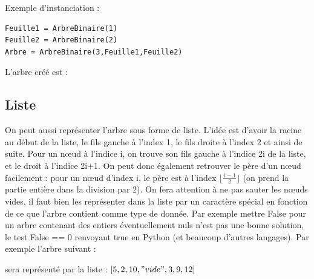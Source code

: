 \documentclass{report}
\begin{document}
Exemple d'instanciation :

\begin{lstlisting}
Feuille1 = ArbreBinaire(1)
Feuille2 = ArbreBinaire(2)
Arbre = ArbreBinaire(3,Feuille1,Feuille2)
\end{lstlisting}

L'arbre créé est :
\begin{center}
\end{center}

\subsection{Liste}

On peut aussi représenter l'arbre sous forme de liste. L'idée est d'avoir la racine au début de la liste, le fils gauche à l'index 1, le fils droite à l'index 2 et ainsi de suite. Pour un nœud à l'indice i, on trouve son fils gauche à l'indice 2i de la liste, et le droit à l'indice 2i+1. 
On peut donc également retrouver le père d'un nœud facilement : pour un nœud d'index i, le père est à l'index $\lfloor \frac{i-1}{2} \rfloor$ (on prend la partie entière dans la division par 2).
On fera attention à ne pas sauter les nœuds vides, il faut bien les représenter dans la liste par un caractère spécial en fonction de ce que l'arbre contient comme type de donnée. Par exemple mettre False pour un arbre contenant des entiers éventuellement nuls n'est pas une bonne solution, le test False == 0 renvoyant true en Python (et beaucoup d'autres langages).
Par exemple l'arbre suivant :

\begin{center}
\end{center}

sera représenté par la liste :
$[5,2,10,"vide",3,9,12]$
\end{document}
